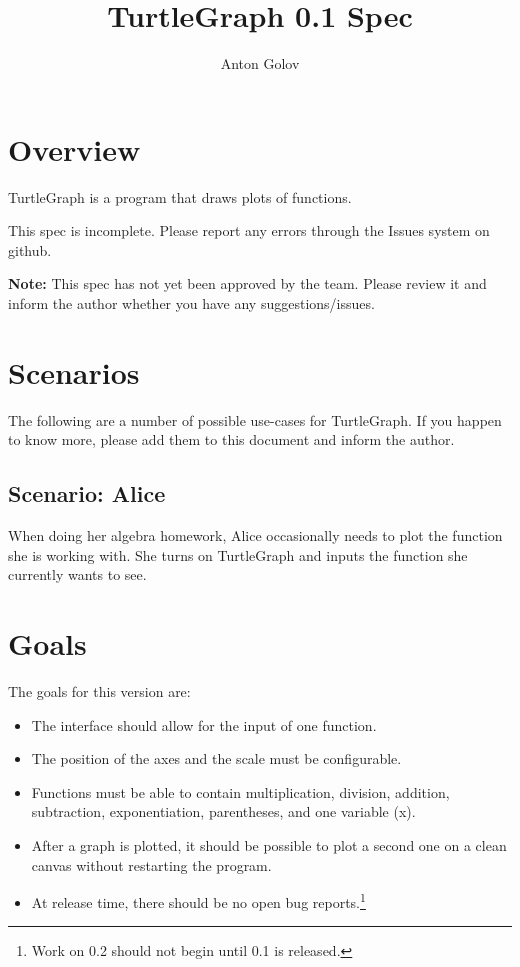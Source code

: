 \documentclass[12pt,a4paper]{article}
\title{TurtleGraph 0.1 Spec}
\author{Anton Golov}
\begin{document}
	\maketitle{}
	\newpage
	\tableofcontents{}
	\newpage
	\section{Overview}
		TurtleGraph is a program that draws plots of functions.

		This spec is incomplete.  Please report any errors through the Issues system on github.

		\textbf{Note:} This spec has not yet been approved by the team.  Please review it and inform the author whether you have any suggestions/issues.

	\section{Scenarios}
		The following are a number of possible use-cases for TurtleGraph.  If you happen to know more, please add them to this document and inform the author.
		\subsection{Scenario: Alice}
			When doing her algebra homework, Alice occasionally needs to plot the function she is working with.  She turns on TurtleGraph and inputs the function she currently wants to see.

	\section{Goals}
		The goals for this version are:
		\begin{itemize}
			\item The interface should allow for the input of one function.
			\item The position of the axes and the scale must be configurable.
			\item Functions must be able to contain multiplication, division, addition, subtraction, exponentiation, parentheses, and one variable (x).
			\item After a graph is plotted, it should be possible to plot a second one on a clean canvas without restarting the program.
			\item At release time, there should be no open bug reports.\footnote{Work on 0.2 should not begin until 0.1 is released.}
		\end{itemize}
\end{document}
